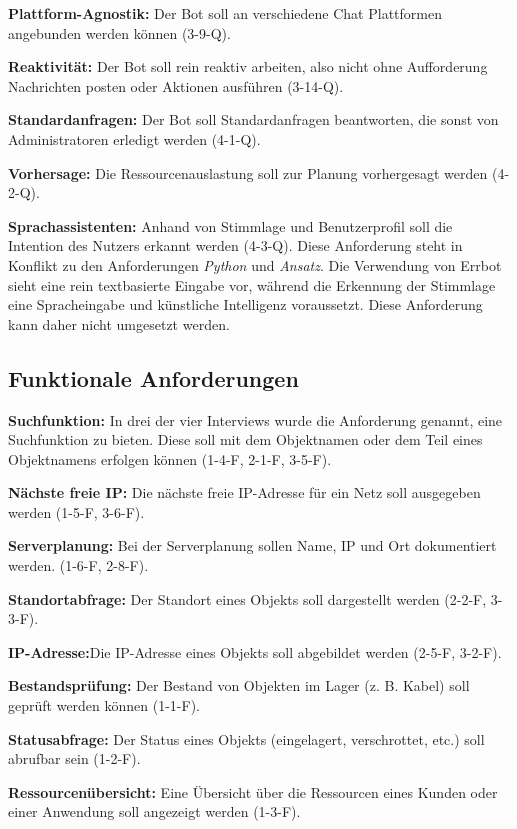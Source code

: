 \textbf{Plattform-Agnostik:} Der Bot soll an verschiedene Chat Plattformen angebunden werden können (3-9-Q).

\textbf{Reaktivität:} Der Bot soll rein reaktiv arbeiten, also nicht ohne Aufforderung Nachrichten posten oder Aktionen ausführen (3-14-Q).

\textbf{Standardanfragen:} Der Bot soll Standardanfragen beantworten, die sonst von Administratoren erledigt werden (4-1-Q).

\textbf{Vorhersage:} Die Ressourcenauslastung soll zur Planung vorhergesagt werden (4-2-Q).

\textbf{Sprachassistenten:} Anhand von Stimmlage und Benutzerprofil soll die Intention des Nutzers erkannt werden (4-3-Q). Diese Anforderung steht in Konflikt zu den Anforderungen \textit{Python} und \textit{Ansatz}. Die Verwendung von Errbot sieht eine rein textbasierte Eingabe vor, während die Erkennung der Stimmlage eine Spracheingabe und künstliche Intelligenz voraussetzt. Diese Anforderung kann daher nicht umgesetzt werden.

\newpage
\subsection{Funktionale Anforderungen}
\textbf{Suchfunktion: } In drei der vier Interviews wurde die Anforderung genannt, eine Suchfunktion zu bieten. Diese soll mit dem Objektnamen oder dem Teil eines Objektnamens erfolgen können (1-4-F, 2-1-F, 3-5-F).

\textbf{Nächste freie IP: } Die nächste freie IP-Adresse für ein Netz soll ausgegeben werden (1-5-F, 3-6-F). 

\textbf{Serverplanung: } Bei der Serverplanung sollen Name, IP und Ort dokumentiert werden. (1-6-F, 2-8-F).

\textbf{Standortabfrage: } Der Standort eines Objekts soll dargestellt werden (2-2-F, 3-3-F).

\textbf{IP-Adresse:}Die IP-Adresse eines Objekts soll abgebildet werden (2-5-F, 3-2-F).

\textbf{Bestandsprüfung:} Der Bestand von Objekten im Lager (z. B. Kabel) soll geprüft werden können (1-1-F).

\textbf{Statusabfrage: }Der Status eines Objekts (eingelagert, verschrottet, etc.) soll abrufbar sein (1-2-F).

\textbf{Ressourcenübersicht:} Eine Übersicht über die Ressourcen eines Kunden oder einer Anwendung soll angezeigt werden (1-3-F).

